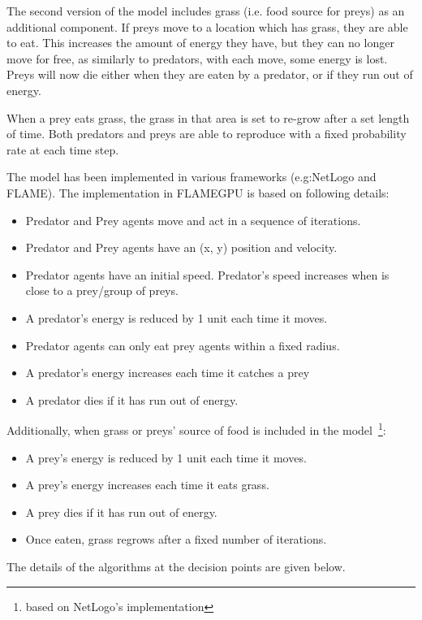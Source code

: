 The second version of the model includes grass (i.e. food source for preys) as an additional component. If preys move to a location which has grass, they are able to eat. This increases the amount of energy they have, but they can no longer move for free, as similarly to predators, with each move, some energy is lost. Preys will now die either when they are eaten by a predator, or if they run out of energy.

When a prey eats grass, the grass in that area is set to re-grow after a set length of time. Both
predators and preys are able to reproduce with a fixed probability rate at each time step.


The model has been implemented in various frameworks (e.g:NetLogo and FLAME). The implementation in FLAMEGPU is based on following details:


\begin{itemize}
\item Predator and Prey agents move and act in a sequence of iterations.
\item Predator and Prey agents have an (x, y) position and velocity.
\item Predator agents have an initial speed. Predator's speed increases when is close to a prey/group of preys.
\item A predator’s energy is reduced by 1 unit each time it moves.
\item Predator agents can only eat prey agents within a fixed radius.
\item A predator’s energy increases each time it catches a prey
\item A predator dies if it has run out of energy.
\end{itemize}
Additionally, when grass or preys' source of food is included in the model~\footnote{based on NetLogo's implementation}:
\begin{itemize}
\item A prey’s energy is reduced by 1 unit each time it moves.
\item A prey’s energy increases each time it eats grass.
\item A prey dies if it has run out of energy.
\item Once eaten, grass regrows after a fixed number of iterations.
\end{itemize}

The details of the algorithms at the decision points are given below.

